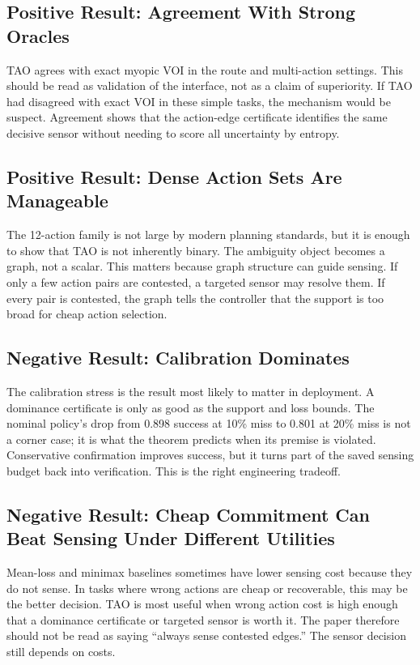 \documentclass{article}
\begin{document}
\subsection{Positive Result: Agreement With Strong Oracles}

TAO agrees with exact myopic VOI in the route and multi-action settings. This should be read as validation of the interface, not as a claim of superiority. If TAO had disagreed with exact VOI in these simple tasks, the mechanism would be suspect. Agreement shows that the action-edge certificate identifies the same decisive sensor without needing to score all uncertainty by entropy.

\subsection{Positive Result: Dense Action Sets Are Manageable}

The 12-action family is not large by modern planning standards, but it is enough to show that TAO is not inherently binary. The ambiguity object becomes a graph, not a scalar. This matters because graph structure can guide sensing. If only a few action pairs are contested, a targeted sensor may resolve them. If every pair is contested, the graph tells the controller that the support is too broad for cheap action selection.

\subsection{Negative Result: Calibration Dominates}

The calibration stress is the result most likely to matter in deployment. A dominance certificate is only as good as the support and loss bounds. The nominal policy's drop from 0.898 success at 10\% miss to 0.801 at 20\% miss is not a corner case; it is what the theorem predicts when its premise is violated. Conservative confirmation improves success, but it turns part of the saved sensing budget back into verification. This is the right engineering tradeoff.

\subsection{Negative Result: Cheap Commitment Can Beat Sensing Under Different Utilities}

Mean-loss and minimax baselines sometimes have lower sensing cost because they do not sense. In tasks where wrong actions are cheap or recoverable, this may be the better decision. TAO is most useful when wrong action cost is high enough that a dominance certificate or targeted sensor is worth it. The paper therefore should not be read as saying ``always sense contested edges.'' The sensor decision still depends on costs.
\end{document}
